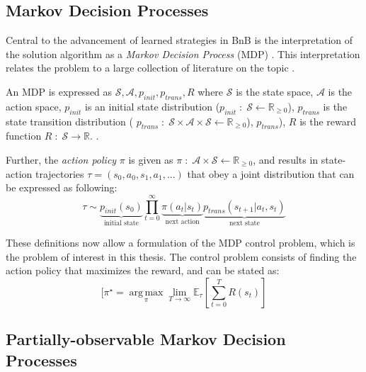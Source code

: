 \subsection{Markov Decision Processes}\label{sec:mdp}

Central to the advancement of learned strategies in \gls{BnB} is the interpretation of the solution algorithm as a \textit{Markov Decision Process} (\gls{MDP}) \cite{gasse2019exact}. This interpretation relates the problem to a large collection of literature on the topic \cite{howard1960dynamic}.

An \gls{MDP} is expressed as $ \mathcal{S}, \mathcal{A}, p_{init}, p_{trans}, R$ 
where $ \mathcal{S}$ is the state space, 
$\mathcal{A}$ is the action space, 
$p_{init}$ is an initial state distribution ($p_{init}\;:\;\mathcal{S}\leftarrow \mathbb{R}_{\geq 0}$), 
$p_{trans}$ is the state transition distribution (
$p_{trans}\; : \; \mathcal{S}
\times \mathcal{A}\times \mathcal{S}
\leftarrow \mathbb{R}_{\geq 0}$), 
$p_{trans}$), $R$ is the reward function $R\;:\;\mathcal{S} \rightarrow \mathbb{R}$. \cite{prouvost2020ecole}. 

Further, the \textit{action policy} $\pi$ is given as $\pi \; : \; \mathcal{A}\times \mathcal{S}
\leftarrow \mathbb{R}_{\geq 0}$, and results in state-action trajectories $\tau = (s_0, a_0, s_1, a_1, ... )$ that obey a joint distribution that can be expressed as following: \cite{prouvost2020ecole}
\begin{equation}
    \tau \sim \underbrace{p_\textit{init}(s_0)}_{\text{initial state}}
\prod_{t=0}^\infty \underbrace{\pi(a_t | s_t)}_{\text{next action}}
\underbrace{p_\textit{trans}(s_{t+1} | a_t, s_t)}_{\text{next state}}
\end{equation}

These definitions now allow a formulation of the \gls{MDP} control problem, which is the problem of interest in this thesis. The control problem consists of finding the action policy that maximizes the reward, and can be stated as: \cite{prouvost2020ecole}
\begin{equation}\label{eq:mdprcontrol}
    [\pi^\star = \underset{\pi}{\operatorname{arg\,max}}
\lim_{T \to \infty} \mathbb{E}_\tau\left[\sum_{t=0}^{T} R(s_t)\right]
\end{equation}


\subsection{Partially-observable Markov Decision Processes}

